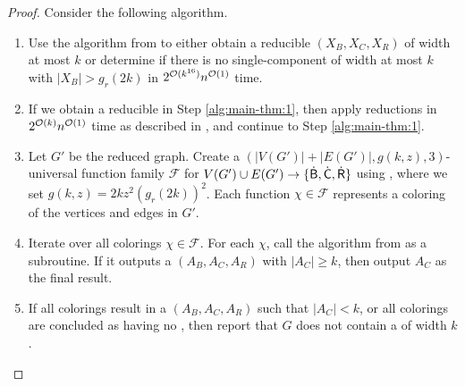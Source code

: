 \begin{proof}
  Consider the following algorithm.

  \begin{enumerate}
    \item Use the algorithm from  to either obtain a reducible \occ $(X_B,X_C,X_R)$ of width at most $k$
    or determine if there is no single-component \occ of width at most $k$ with $|X_B| > g_r(2k)$
    in $2^{\mathcal{O}(k^{16})}n^{\mathcal{O}(1)}$ time.
    \label{alg:main-thm:1}

    \item If we obtain a reducible \occ in Step \ref{alg:main-thm:1}, then apply reductions in $2^{\mathcal{O}(k)} n^{\mathcal{O}(1)}$ time
    as described in , and continue to Step \ref{alg:main-thm:1}.
    \label{alg:main-thm:2}
    
    \item Let $G'$ be the reduced graph.
    Create a $(|V(G')|+|E(G')|,g(k,z),3)$-universal function family $\mathcal{F}$ for $V(G') \cup E(G') \to \{\mathsf{\dot{B}}, \mathsf{\dot{C}}, \mathsf{\dot{R}}\}$
    using , where we set $g(k,z) = 2kz^2 (g_r(2k))^2$.
    Each function $\chi \in \mathcal{F}$ represents a coloring of the vertices and edges in $G'$.
    \label{alg:main-thm:3}

    \item Iterate over all colorings $\chi \in \mathcal{F}$.
    For each $\chi$, call the algorithm from  as a subroutine.
    If it outputs a \zocc $(A_B, A_C, A_R)$ with $|A_C| \geq k$, then output $A_C$ as the final result.
    \label{alg:main-thm:4}

    \item If all colorings result in a \zocc $(A_B, A_C, A_R)$ such that $|A_C| < k$,
    or all colorings are concluded as having no \zoccs, then report that $G$ does not contain a \zocc
    of width $k$.
    \label{alg:main-thm:5}
  \end{enumerate}
  

\end{proof}
